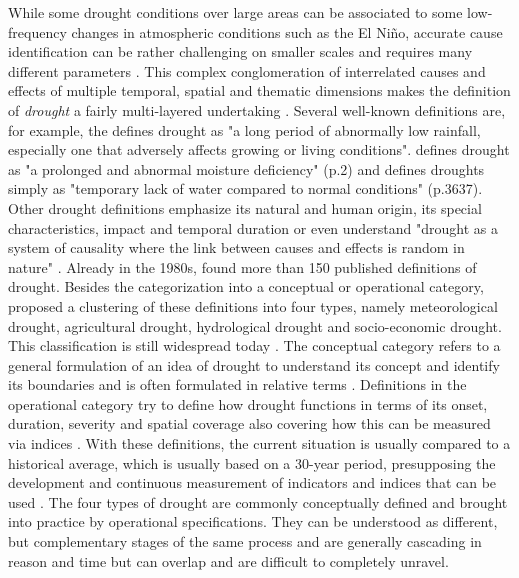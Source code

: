 While some drought conditions over large areas can be associated to some low-frequency changes in atmospheric conditions such as the El Niño, accurate cause identification can be rather challenging on smaller scales and requires many different parameters \autocite{botaiAnalysisDroughtProgression2019, undrrSpecialReportDrought2021}. This complex conglomeration of interrelated causes and effects of multiple temporal, spatial and thematic dimensions makes the definition of \textit{drought} a fairly multi-layered undertaking \autocite{balintMonitoringDroughtCombined2013}. Several well-known definitions are, for example, the \textcite{theamericanheritagedictionaryoftheenglishlanguageDrought2022} defines drought as "a long period of abnormally low rainfall, especially one that adversely affects growing or living conditions". \Textcite{palmerMeteorologicalDrought1965} defines drought as "a prolonged and abnormal moisture deficiency" (p.2) and \textcite{vanloonDroughtHumanmodifiedWorld2016} defines droughts simply as "temporary lack of water compared to normal conditions" (p.3637). Other drought definitions emphasize its natural and human origin, its special characteristics, impact and temporal duration or even understand "drought as a system of causality where the link between causes and effects is random in nature" \autocites[3]{balintMonitoringDroughtCombined2013}. Already in the 1980s, \cite{wilhiteUnderstandingDroughtPhenomenon1985} found more than 150 published definitions of drought. Besides the categorization into a conceptual or operational category, \textcite{wilhiteUnderstandingDroughtPhenomenon1985} proposed a clustering of these definitions into four types, namely meteorological drought, agricultural drought, hydrological drought and socio-economic drought. This classification is still widespread today \autocite{balintMonitoringDroughtCombined2013, baltiReviewDroughtMonitoring2020,idmpDroughtWaterScarcity2022,undrrSpecialReportDrought2021}.\newline
The conceptual category refers to a general formulation of an idea of drought to understand its concept and identify its boundaries and is often formulated in relative terms \autocite{wilhiteUnderstandingDroughtPhenomenon1985}. Definitions in the operational category try to define how drought functions in terms of its onset, duration, severity and spatial coverage also covering how this can be measured via indices \autocite{balintMonitoringDroughtCombined2013, ndmcWhatDrought2023, wilhiteUnderstandingDroughtPhenomenon1985}. With these definitions, the current situation is usually compared to a historical average, which is usually based on a 30-year period, presupposing the development and continuous measurement of indicators and indices that can be used \autocite{undrrSpecialReportDrought2021,wilhiteUnderstandingDroughtPhenomenon1985}.
The four types of drought are commonly conceptually defined and brought into practice by operational specifications. They can be understood as different, but complementary stages of the same process and are generally cascading in reason and time but can overlap and are difficult to completely unravel. 

